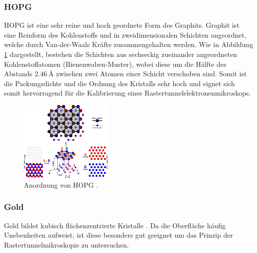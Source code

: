 \subsubsection{HOPG} %
\label{ssub:hopg}

HOPG ist eine sehr reine und hoch geordnete Form des Graphits.
Graphit ist eine Reinform des Kohlenstoffs und in zweidimensionalen Schichten angeordnet, welche durch Van-der-Waals Kräfte zusammengehalten werden.
Wie in Abbildung \ref{fig:hopg} dargestellt, bestehen die Schichten aus sechseckig zueinander angeordneten Kohlenstoffatomen (Bienenwaben-Muster), wobei diese um die Hälfte des Abstands $\SI{2,46}{\angstrom}$ zwischen zwei Atomen einer Schicht verschoben sind.
Somit ist die Packungsdichte und die Ordnung des Kristalls sehr hoch und eignet sich somit hervorragend für die Kalibrierung eines Rastertunnelelektronenmikroskops.
\begin{figure}[!h]
    \centering
    \includegraphics[width=0.4\textwidth]{images/hopg.jpg}
    \caption{Anordnung von HOPG \cite{STM-hopg}.}
    \label{fig:hopg}
\end{figure}

\subsubsection{Gold} %
\label{ssub:gold}

Gold bildet kubisch flächenzentrierte Kristalle \cite{STM-gold}.
Da die Oberfläche häufig Unebenheiten aufweist, ist diese besonders gut geeignet um das Prinzip der Rastertunnelmikroskopie zu untersuchen.
